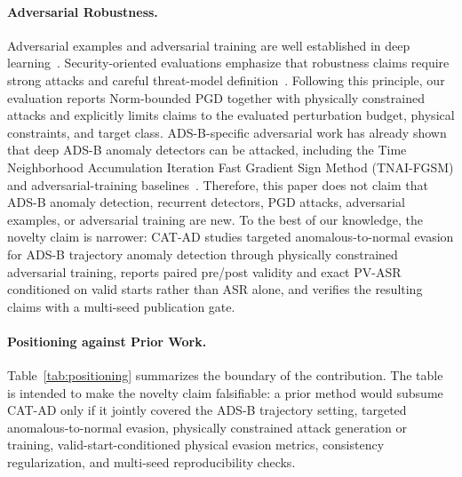 \documentclass[runningheads]{llncs}
\begin{document}
\paragraph{Adversarial Robustness.}
Adversarial examples and adversarial training are well established in deep learning~\cite{goodfellow2015explaining,madry2018towards}.
Security-oriented evaluations emphasize that robustness claims require strong attacks and careful threat-model definition~\cite{carlini2017towards,athalye2018obfuscated}.
Following this principle, our evaluation reports Norm-bounded PGD together with physically constrained attacks and explicitly limits claims to the evaluated perturbation budget, physical constraints, and target class.
ADS-B-specific adversarial work has already shown that deep ADS-B anomaly detectors can be attacked, including the Time Neighborhood Accumulation Iteration Fast Gradient Sign Method (TNAI-FGSM) and adversarial-training baselines~\cite{luo2024adversarialadsb}.
Therefore, this paper does not claim that ADS-B anomaly detection, recurrent detectors, PGD attacks, adversarial examples, or adversarial training are new.
To the best of our knowledge, the novelty claim is narrower: CAT-AD studies targeted anomalous-to-normal evasion for ADS-B trajectory anomaly detection through physically constrained adversarial training, reports paired pre/post validity and exact PV-ASR conditioned on valid starts rather than ASR alone, and verifies the resulting claims with a multi-seed publication gate.

\paragraph{Positioning against Prior Work.}
Table~\ref{tab:positioning} summarizes the boundary of the contribution.
The table is intended to make the novelty claim falsifiable: a prior method would subsume CAT-AD only if it jointly covered the ADS-B trajectory setting, targeted anomalous-to-normal evasion, physically constrained attack generation or training, valid-start-conditioned physical evasion metrics, consistency regularization, and multi-seed reproducibility checks.
\end{document}
